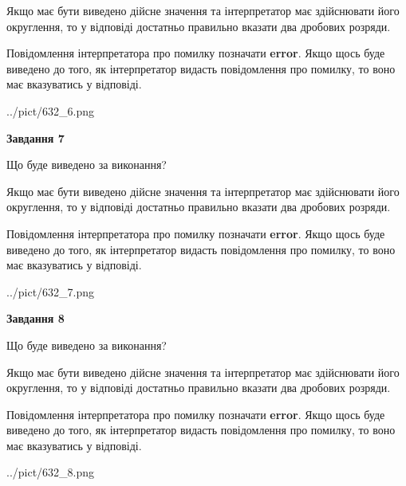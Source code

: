 \documentclass[12pt, ukrainian]{article}
\begin{document}
{\begin {Large}
Якщо має бути виведено дійсне значення та інтерпретатор має здійснювати його округлення, 
то у відповіді достатньо правильно вказати два дробових розряди.

Повідомлення інтерпретатора про помилку позначати \textbf{error}.
Якщо щось буде виведено до того, як інтерпретатор видасть повідомлення про помилку, 
то воно має вказуватись у відповіді. \par

\begin{center}
	{../pict/632_6.png}
\end{center}
\newpage

{\begin {center}\textbf{Завдання 7}\end {center}}\par
Що буде виведено за виконання? \par

Якщо має бути виведено дійсне значення та інтерпретатор має здійснювати його округлення, 
то у відповіді достатньо правильно вказати два дробових розряди.

Повідомлення інтерпретатора про помилку позначати \textbf{error}.
Якщо щось буде виведено до того, як інтерпретатор видасть повідомлення про помилку, 
то воно має вказуватись у відповіді. \par

\begin{center}
	{../pict/632_7.png}
\end{center}
\newpage

{\begin {center}\textbf{Завдання 8}\end {center}}\par
Що буде виведено за виконання? \par

Якщо має бути виведено дійсне значення та інтерпретатор має здійснювати його округлення, 
то у відповіді достатньо правильно вказати два дробових розряди.

Повідомлення інтерпретатора про помилку позначати \textbf{error}.
Якщо щось буде виведено до того, як інтерпретатор видасть повідомлення про помилку, 
то воно має вказуватись у відповіді. \par

\begin{center}
	{../pict/632_8.png}
\end{center}
\newpage


\end{Large}}
\end{document}
